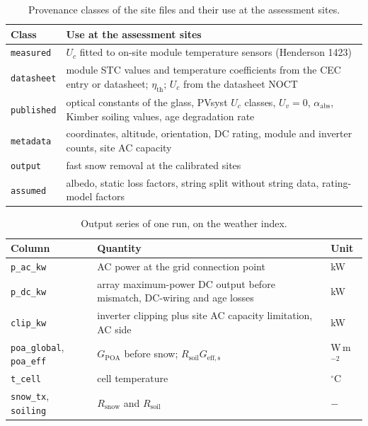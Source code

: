 \documentclass[11pt]{article}
\begin{document}
\begin{table}[htbp]
\centering
\caption{Provenance classes of the site files and their use at the \vNConfigured{} assessment sites.}
\label{tab:s_prov}
\small
\begin{tabularx}{\textwidth}{l >{\raggedright\arraybackslash}X}
\toprule
Class & Use at the assessment sites \\
\midrule
\texttt{measured} & $U_c$ fitted to on-site module temperature sensors (Henderson 1423) \\
\texttt{datasheet} & module STC values and temperature coefficients from the CEC entry or datasheet; $\eta_{\mathrm{th}}$; $U_c$ from the datasheet NOCT \\
\texttt{published} & optical constants of the glass, PVsyst $U_c$ classes, $U_v=0$, $\alpha_{\mathrm{abs}}$, Kimber soiling values, age degradation rate \\
\texttt{metadata} & coordinates, altitude, orientation, DC rating, module and inverter counts, site AC capacity \\
\texttt{output} & fast snow removal at the \vNCal{} calibrated sites \\
\texttt{assumed} & albedo, static loss factors, string split without string data, rating-model factors \\
\bottomrule
\end{tabularx}
\end{table}

\begin{table}[htbp]
\centering
\caption{Output series of one run, on the weather index.}
\label{tab:outputs}
\small
\begin{tabularx}{\textwidth}{l >{\raggedright\arraybackslash}X l}
\toprule
Column & Quantity & Unit \\
\midrule
\texttt{p\_ac\_kw} & AC power at the grid connection point & kW \\
\texttt{p\_dc\_kw} & array maximum-power DC output before mismatch, DC-wiring and age losses & kW \\
\texttt{clip\_kw} & inverter clipping plus site AC capacity limitation, AC side & kW \\
\texttt{poa\_global}, \texttt{poa\_eff} & $G_{\mathrm{POA}}$ before snow; $R_{\mathrm{soil}}G_{\mathrm{eff,s}}$ & W\,m$^{-2}$ \\
\texttt{t\_cell} & cell temperature & $^{\circ}$C \\
\texttt{snow\_tx}, \texttt{soiling} & $R_{\mathrm{snow}}$ and $R_{\mathrm{soil}}$ & $-$ \\
\bottomrule
\end{tabularx}
\end{table}
\end{document}
